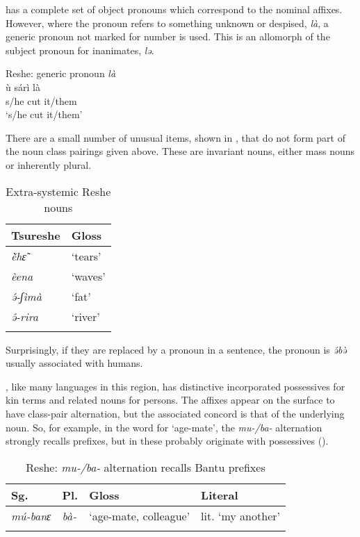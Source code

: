 \documentclass[output=paper]{langsci/langscibook}
\begin{document}
 has a complete set of object pronouns which correspond to the nominal affixes. However, where the pronoun refers to something unknown or despised, \textit{là}, a generic pronoun not marked for number is used. This is an allomorph of the subject pronoun for inanimates, \textit{lə}.

\newpage 
\ea
Reshe: generic pronoun \textit{là}\\
\gll ù sárì là \\
      s/he cut  it/them\\
\glt ‘s/he cut it/them’\\
\z

There are a small number of unusual items, shown in , that do not form part of the noun class pairings given above. These are invariant nouns, either mass nouns or inherently plural.

\begin{table}
\caption{Extra-systemic Reshe nouns}
\label{tab:kainji:3}
\begin{tabularx}{.5\textwidth}{QQ}
\lsptoprule
{Tsureshe}	& {Gloss}\\
\midrule
\textit{ẽ̀hɛ̃}	& ‘tears’\\
\textit{èena}	& ‘waves’\\
\textit{ə́-ʃìmà}	& ‘fat’\\
\textit{ə́-rira}	& ‘river’\\
\lspbottomrule
\end{tabularx}
\end{table}

Surprisingly, if they are replaced by a pronoun in a sentence, the pronoun is \textit{ə́bə̀} usually associated with humans.

, like many languages in this region, has distinctive incorporated possessives for kin terms and related nouns for persons. The affixes appear on the surface to have class-pair alternation, but the associated concord is that of the underlying noun. So, for example, in the word for ‘age-mate’, the \textit{mu-/ba-} alternation strongly recalls  prefixes, but in  these probably originate with possessives ().

\begin{table}
\caption{Reshe: \textit{mu-/ba-} alternation recalls Bantu prefixes} 
\label{extab:kainji:5}
\begin{tabularx}{\textwidth}{llQQ}
\lsptoprule
  {Sg.}	&   {Pl.}	&   {Gloss}	&   {Literal}\\
  \midrule
 \textit{mú-banɛ}	&  \textit{bà-}	& ‘age-mate,   colleague’	& lit. ‘my   another’\\
 \lspbottomrule
\end{tabularx}
\end{table}
\end{document}
